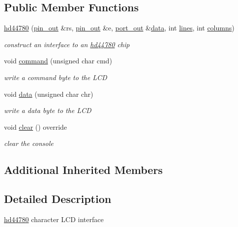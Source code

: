 \subsection*{Public Member Functions}
\begin{DoxyCompactItemize}
\item 
\hyperlink{classhwlib_1_1hd44780_a36e0fde84edc8baf6e1362277c11d6c0}{hd44780} (\hyperlink{classhwlib_1_1pin__out}{pin\+\_\+out} \&rs, \hyperlink{classhwlib_1_1pin__out}{pin\+\_\+out} \&e, \hyperlink{classhwlib_1_1port__out}{port\+\_\+out} \&\hyperlink{classhwlib_1_1hd44780_a9a80f74a98efab5fe3a78e8649fd95bb}{data}, int \hyperlink{classhwlib_1_1console_a7c5ec25f5c780aaa56702778701ee270}{lines}, int \hyperlink{classhwlib_1_1console_a5dbe79428aadd15210029a76cb3d255d}{columns})
\begin{DoxyCompactList}\small\item\em construct an interface to an \hyperlink{classhwlib_1_1hd44780}{hd44780} chip \end{DoxyCompactList}\item 
void \hyperlink{classhwlib_1_1hd44780_aa2f8b43bd269d52dd281ec9e90a54f19}{command} (unsigned char cmd)
\begin{DoxyCompactList}\small\item\em write a command byte to the L\+CD \end{DoxyCompactList}\item 
void \hyperlink{classhwlib_1_1hd44780_a9a80f74a98efab5fe3a78e8649fd95bb}{data} (unsigned char chr)
\begin{DoxyCompactList}\small\item\em write a data byte to the L\+CD \end{DoxyCompactList}\item 
void \hyperlink{classhwlib_1_1hd44780_a45d4a84c9da66fa350270df482c6e58f}{clear} () override
\begin{DoxyCompactList}\small\item\em clear the console \end{DoxyCompactList}\end{DoxyCompactItemize}
\subsection*{Additional Inherited Members}


\subsection{Detailed Description}
\hyperlink{classhwlib_1_1hd44780}{hd44780} character L\+CD interface 

